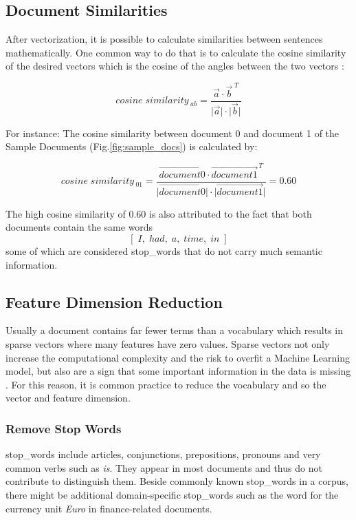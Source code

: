 \subsection{Document Similarities}\label{subsec:document-similarities}
After vectorization, it is possible to calculate similarities between sentences mathematically.
One common way to do that is to calculate the cosine similarity of the desired vectors which is the cosine of the angles between the two vectors \cite{CosineSimilarity}:

\begin{equation}
cosine\;similarity\,{_{ab}} = \frac{\vec{a} \cdot  \vec{b}^{\;T}}{\lvert{\vec{a}}\rvert \cdot \lvert{\vec{b}}\rvert}\label{eq:cossim1}
\end{equation}

For instance: The cosine similarity between document 0 and document 1 of the Sample Documents (Fig.\ref{fig:sample_docs}) is calculated by:

$$ cosine\;similarity\,{_{01}} = \frac{\vec{document0} \cdot  \vec{document1}^{\,T}}{\lvert{\vec{document0}}\rvert \cdot \lvert{\vec{document1}}\rvert} = 0.60 $$

The high cosine similarity of 0.60 is also attributed to the fact that both documents contain the same words
$$ [\;I,\;had,\;a,\;time,\;in\;] $$
some of which are considered \gls{stop_words} that do not carry much semantic information.

\subsection{Feature Dimension Reduction}\label{subsec:techniques-to-reduce-vocabulary}
Usually a \gls{document} contains far fewer terms than a \gls{vocabulary} which results in sparse vectors where many features have zero values.
Sparse vectors not only increase the computational complexity and the risk to overfit a Machine Learning model, but also are a sign that some
important information in the data is missing \cite{ProblemsWithSparseVectors}.
For this reason, it is common practice to reduce the \gls{vocabulary} and so the vector and feature dimension.

\subsubsection{Remove Stop Words}\label{subsubsec:remove-stop-words}
\gls{stop_words} include articles, conjunctions, prepositions, pronouns and very common verbs such as \emph{is}.
They appear in most \glspl{document} and thus do not contribute to distinguish them.
Beside commonly known \gls{stop_words} in a \gls{corpus}, there might be additional domain-specific \gls{stop_words} such as the word for the currency unit \emph{Euro} in finance-related \glspl{document}.

